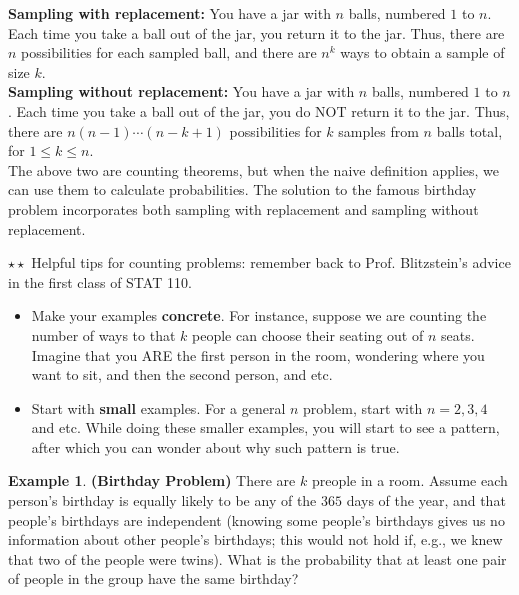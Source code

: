 \documentclass[10pt]{article}
\theoremstyle{definition}
\newtheorem{example}[theo]{\color{Maroon} Example}
\theoremstyle{remark}
\begin{document}
\noindent
\textbf{Sampling with replacement: }You have a jar with $n$ balls, numbered $1$ to $n$. Each time you take a ball out of the jar, you return it to the jar. Thus, there are $n$ possibilities for each sampled ball, and there are $n^k$ ways to obtain a sample of size $k$. \\

\noindent
\textbf{Sampling without replacement: }You have a jar with $n$ balls, numbered $1$ to $n$. Each time you take a ball out of the jar, you do NOT return it to the jar. Thus, there are $n(n-1)\cdots(n-k+1)$ possibilities for $k$ samples from $n$ balls total, for $1 \le k \le n$. \\

\noindent
The above two are counting theorems, but when the naive definition applies, we can use them to calculate probabilities. The solution to the famous birthday problem incorporates both sampling with replacement and sampling without replacement.

\smallskip
\noindent \dotfill 

\noindent $\star \star$ Helpful tips for counting problems: remember back to Prof. Blitzstein's advice in the first class of STAT 110. 
\begin{itemize}
    \item Make your examples \textbf{concrete}. For instance, suppose we are counting the number of ways to that $k$ people can choose their seating out of $n$ seats. Imagine that you ARE the first person in the room, wondering where you want to sit, and then the second person, and etc.
    \item Start with \textbf{small} examples. For a general $n$ problem, start with $n=2,3,4$ and etc. While doing these smaller examples, you will start to see a pattern, after which you can wonder about why such pattern is true. 
\end{itemize}
\noindent\dotfill

\begin{example} \textbf{(Birthday Problem)} There are $k$ preople in a room. Assume each person's birthday is equally likely to be any of the $365$ days of the year, and that people's birthdays are independent (knowing some people's birthdays gives us no information about other people's birthdays; this would not hold if, e.g., we knew that two of the people were twins). What is the probability that at least one pair of people in the group have the same birthday?
\end{example}
\end{document}
